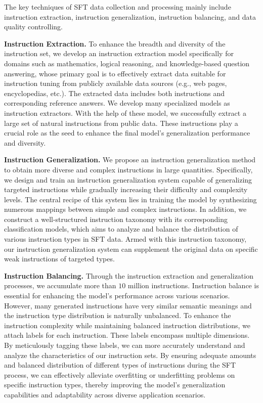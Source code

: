 \documentclass{article}
\begin{document}
The key techniques of SFT data collection and processing mainly include instruction extraction, instruction generalization, instruction balancing, and data quality controlling.

\textbf{Instruction Extraction.}
To enhance the breadth and diversity of the instruction set, we develop an instruction extraction model specifically for domains such as mathematics, logical reasoning, and knowledge-based question answering, whose primary goal is to effectively extract data suitable for instruction tuning from publicly available data sources (e.g., web pages, encyclopedias, etc.). The extracted data includes both instructions and corresponding reference answers. We develop many specialized models as instruction extractors. With the help of these model, we successfully extract a large set of natural instructions from public data. These instructions play a crucial role as the seed to enhance the final model's generalization performance and diversity.

\textbf{Instruction Generalization.}
We propose an instruction generalization method to obtain more diverse and complex instructions in large quantities.
Specifically, we design and train an instruction generalization system capable of generalizing targeted instructions while gradually increasing their difficulty and complexity levels. The central recipe of this system lies in training the model by synthesizing numerous mappings between simple and complex instructions.
In addition, we construct a well-structured instruction taxonomy with its corresponding classification models, which aims to analyze and balance the distribution of various instruction types in SFT data. Armed with this instruction taxonomy, our instruction generalization system can supplement the original data on specific weak instructions of targeted types.

\textbf{Instruction Balancing.}
Through the instruction extraction and generalization processes, we accumulate more than $10$ million instructions. Instruction balance is essential for enhancing the model's performance across various scenarios. However, many generated instructions have very similar semantic meanings and the instruction type distribution is naturally unbalanced.
To enhance the instruction complexity while maintaining balanced instruction distributions, we attach labels for each instruction. These labels encompass multiple dimensions. By meticulously tagging these labels, we can more accurately understand and analyze the characteristics of our instruction sets. 
By ensuring adequate amounts and balanced distribution of different types of instructions during the SFT process, we can effectively alleviate overfitting or underfitting problems on specific instruction types, thereby improving the model's generalization capabilities and adaptability across diverse application scenarios.
\end{document}
